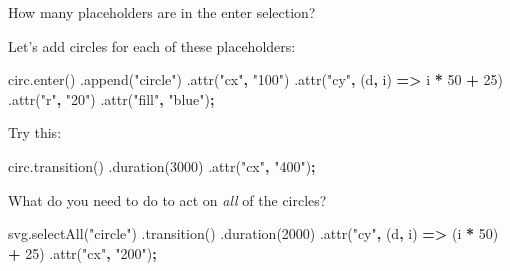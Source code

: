 \documentclass[openany]{book}
\newenvironment{Shaded}{\begin{snugshade}}{\end{snugshade}}
\newcommand{\AttributeTok}[1]{\textcolor[rgb]{0.77,0.63,0.00}{#1}}
\newcommand{\DecValTok}[1]{\textcolor[rgb]{0.00,0.00,0.81}{#1}}
\newcommand{\NormalTok}[1]{#1}
\newcommand{\OperatorTok}[1]{\textcolor[rgb]{0.81,0.36,0.00}{\textbf{#1}}}
\newcommand{\StringTok}[1]{\textcolor[rgb]{0.31,0.60,0.02}{#1}}
\newcommand{\VariableTok}[1]{\textcolor[rgb]{0.00,0.00,0.00}{#1}}
\begin{document}
How many placeholders are in the enter selection?

Let's add circles for each of these placeholders:

\begin{Shaded}
\begin{Highlighting}[]
\VariableTok{circ}\NormalTok{.}\AttributeTok{enter}\NormalTok{()}
\NormalTok{    .}\AttributeTok{append}\NormalTok{(}\StringTok{"circle"}\NormalTok{)}
\NormalTok{      .}\AttributeTok{attr}\NormalTok{(}\StringTok{"cx"}\OperatorTok{,} \StringTok{"100"}\NormalTok{)}
\NormalTok{      .}\AttributeTok{attr}\NormalTok{(}\StringTok{"cy"}\OperatorTok{,}\NormalTok{ (d}\OperatorTok{,}\NormalTok{ i) }\OperatorTok{=>}\NormalTok{ i }\OperatorTok{*} \DecValTok{50} \OperatorTok{+} \DecValTok{25}\NormalTok{)}
\NormalTok{      .}\AttributeTok{attr}\NormalTok{(}\StringTok{"r"}\OperatorTok{,} \StringTok{"20"}\NormalTok{)}
\NormalTok{      .}\AttributeTok{attr}\NormalTok{(}\StringTok{"fill"}\OperatorTok{,} \StringTok{"blue"}\NormalTok{)}\OperatorTok{;}
\end{Highlighting}
\end{Shaded}

Try this:

\begin{Shaded}
\begin{Highlighting}[]
\VariableTok{circ}\NormalTok{.}\AttributeTok{transition}\NormalTok{()}
\NormalTok{  .}\AttributeTok{duration}\NormalTok{(}\DecValTok{3000}\NormalTok{)}
\NormalTok{  .}\AttributeTok{attr}\NormalTok{(}\StringTok{"cx"}\OperatorTok{,} \StringTok{"400"}\NormalTok{)}\OperatorTok{;}
\end{Highlighting}
\end{Shaded}

What do you need to do to act on \emph{all} of the circles?

\begin{Shaded}
\begin{Highlighting}[]
\VariableTok{svg}\NormalTok{.}\AttributeTok{selectAll}\NormalTok{(}\StringTok{"circle"}\NormalTok{)}
\NormalTok{  .}\AttributeTok{transition}\NormalTok{()}
\NormalTok{  .}\AttributeTok{duration}\NormalTok{(}\DecValTok{2000}\NormalTok{)}
\NormalTok{  .}\AttributeTok{attr}\NormalTok{(}\StringTok{"cy"}\OperatorTok{,}\NormalTok{ (d}\OperatorTok{,}\NormalTok{ i) }\OperatorTok{=>}\NormalTok{ (i }\OperatorTok{*} \DecValTok{50}\NormalTok{) }\OperatorTok{+} \DecValTok{25}\NormalTok{)}
\NormalTok{  .}\AttributeTok{attr}\NormalTok{(}\StringTok{"cx"}\OperatorTok{,} \StringTok{"200"}\NormalTok{)}\OperatorTok{;}
\end{Highlighting}
\end{Shaded}
\end{document}
